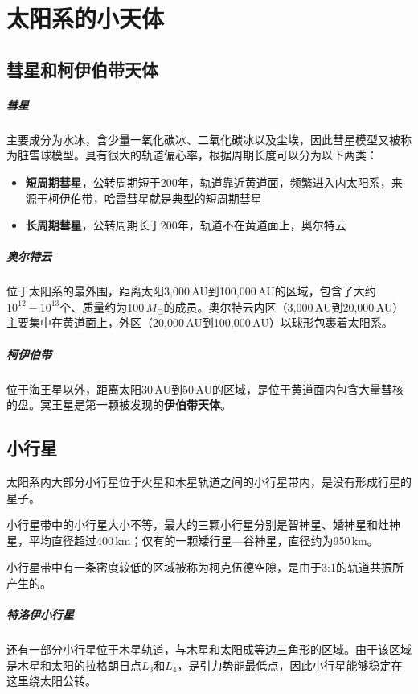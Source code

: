 \documentclass[openany]{ctexbook}
\begin{document}
\setcounter{chapter}{21}
\chapter{太阳系的小天体}
\section{彗星和柯伊伯带天体}
\paragraph{彗星}
主要成分为水冰，含少量一氧化碳冰、二氧化碳冰以及尘埃，因此彗星模型又被称为脏雪球模型。具有很大的轨道偏心率，根据周期长度可以分为以下两类：
\begin{itemize}
  \item \textbf{短周期彗星}，公转周期短于200年，轨道靠近黄道面，频繁进入内太阳系，来源于柯伊伯带，哈雷彗星就是典型的短周期彗星
  \item \textbf{长周期彗星}，公转周期长于200年，轨道不在黄道面上，奥尔特云
\end{itemize}

\paragraph{奥尔特云}
位于太阳系的最外围，距离太阳3,000\,AU到100,000\,AU的区域，包含了大约$10^{12}-10^{13}$个、质量约为$100\,M_\odot$的成员。奥尔特云内区（3,000\,AU到20,000\,AU）主要集中在黄道面上，外区（20,000\,AU到100,000\,AU）以球形包裹着太阳系。

\paragraph{柯伊伯带}
位于海王星以外，距离太阳30\,AU到50\,AU的区域，是位于黄道面内包含大量彗核的盘。冥王星是第一颗被发现的\textbf{伊伯带天体}。

\section{小行星}
太阳系内大部分小行星位于火星和木星轨道之间的小行星带内，是没有形成行星的星子。

小行星带中的小行星大小不等，最大的三颗小行星分别是智神星、婚神星和灶神星，平均直径超过400\,km；仅有的一颗矮行星—谷神星，直径约为950\,km。

小行星带中有一条密度较低的区域被称为柯克伍德空隙，是由于3:1的轨道共振所产生的。

\paragraph{特洛伊小行星}
还有一部分小行星位于木星轨道，与木星和太阳成等边三角形的区域。由于该区域是木星和太阳的拉格朗日点$L_3$和$L_4$，是引力势能最低点，因此小行星能够稳定在这里绕太阳公转。
\end{document}
